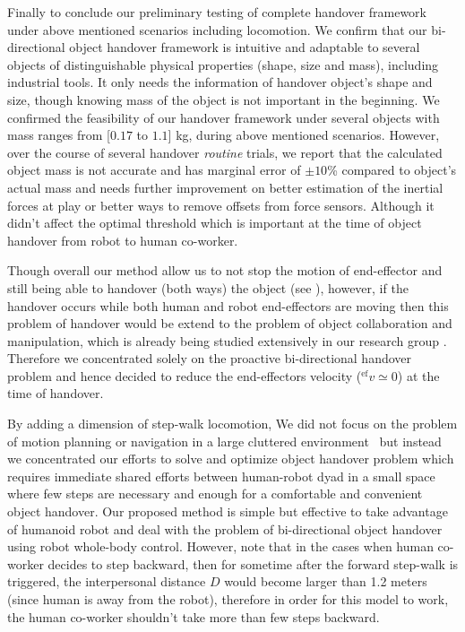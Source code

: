  
Finally to conclude our preliminary testing of complete handover framework under above mentioned scenarios including locomotion. We confirm that our bi-directional object handover framework is intuitive and adaptable to several objects of distinguishable physical properties (shape, size and mass), including  industrial tools. It only needs the information of handover object's shape and size, though knowing mass of the object is not important in the beginning. We confirmed the feasibility of our handover framework under several objects with mass ranges from [$0.17$ to $1.1$] kg, during above mentioned scenarios. However, over the course of several handover \textit{routine} trials, we report that the calculated object mass is not accurate and has marginal error of $ \pm10 $\% compared to object's actual mass and needs further improvement on better estimation of the inertial forces at play or  better ways to remove offsets from force sensors. Although it didn't affect the optimal threshold which is important at the time of object handover from robot to human co-worker.

Though overall our method allow us to not stop the motion of end-effector and still being able to handover (both ways) the object (see ), however, if the handover occurs while both human and robot end-effectors are moving then this problem of handover would be extend to the problem of object collaboration and manipulation, which is already being studied extensively in our research group \cite{bussy2012proactive, agravante2016walking, agravante2013human, bussy2012human, agravante2014collaborative, Agravante2019}. Therefore we concentrated solely on the proactive bi-directional handover problem and hence decided to reduce the end-effectors velocity (${}^\text{ef}v\simeq0$) at the time of handover. 

By adding a dimension of step-walk locomotion, We did not focus on the problem of motion planning or navigation in a large cluttered environment~\cite{mainprice2012sharing, vahrenkamp2009humanoid, kim2004advanced} but instead we concentrated our efforts to solve and optimize object handover problem which requires immediate shared efforts between human-robot dyad in a small space where few steps are necessary and enough for a comfortable and convenient object handover. Our proposed method is simple but effective to take advantage of humanoid robot and deal with the problem of bi-directional object handover using robot whole-body control. However, note that in the cases when human co-worker decides to step backward, then for sometime after the forward step-walk is triggered, the interpersonal distance $ D $ would become larger than 1.2 meters (since human is away from the robot), therefore in order for this model to work, the human co-worker shouldn't take more than few steps backward. 

